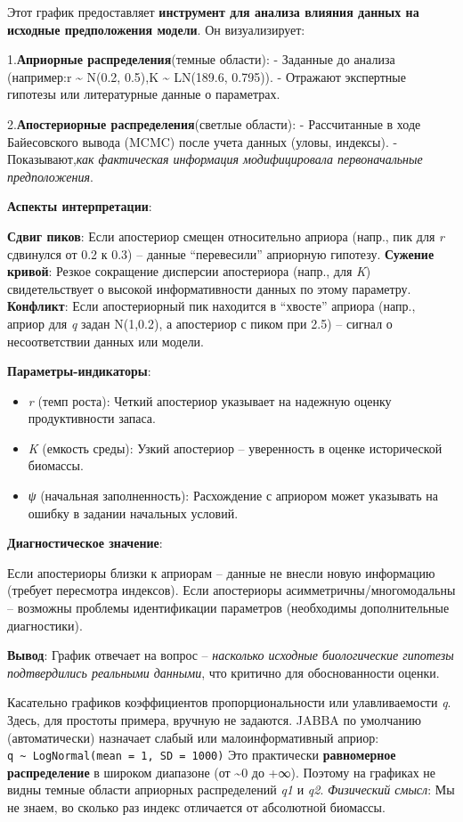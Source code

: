 \documentclass[
  letterpaper,
  DIV=11,
  numbers=noendperiod]{scrreprt}
\providecommand{\tightlist}{%
  \setlength{\itemsep}{0pt}\setlength{\parskip}{0pt}}
\begin{document}
Этот график предоставляет \textbf{инструмент для анализа влияния данных
на исходные предположения модели}. Он визуализирует:

1.\textbf{Априорные распределения}(темные области): - Заданные до
анализа (например:r \textasciitilde{} N(0.2, 0.5),K \textasciitilde{}
LN(189.6, 0.795)). - Отражают экспертные гипотезы или литературные
данные о параметрах.

2.\textbf{Апостериорные распределения}(светлые области): - Рассчитанные
в ходе Байесовского вывода (MCMC) после учета данных (уловы, индексы). -
Показывают,\emph{как фактическая информация модифицировала
первоначальные предположения}.

\textbf{Аспекты интерпретации}:

\textbf{Сдвиг пиков}: Если апостериор смещен относительно априора
(напр., пик для \emph{r} сдвинулся от 0.2 к 0.3) -- данные
``перевесили'' априорную гипотезу. \textbf{Сужение кривой}: Резкое
сокращение дисперсии апостериора (напр., для \emph{K}) свидетельствует о
высокой информативности данных по этому параметру. \textbf{Конфликт}:
Если апостериорный пик находится в ``хвосте'' априора (напр., априор для
\emph{q} задан N(1,0.2), а апостериор с пиком при 2.5) -- сигнал о
несоответствии данных или модели.

\textbf{Параметры-индикаторы}:

\begin{itemize}
\tightlist
\item
  \emph{r} (темп роста): Четкий апостериор указывает на надежную оценку
  продуктивности запаса.
\item
  \emph{K} (емкость среды): Узкий апостериор -- уверенность в оценке
  исторической биомассы.
\item
  \emph{ψ} (начальная заполненность): Расхождение с априором может
  указывать на ошибку в задании начальных условий.
\end{itemize}

\textbf{Диагностическое значение}:

Если апостериоры близки к априорам -- данные не внесли новую информацию
(требует пересмотра индексов). Если апостериоры
асимметричны/многомодальны -- возможны проблемы идентификации параметров
(необходимы дополнительные диагностики).

\textbf{Вывод}: График отвечает на вопрос -- \emph{насколько исходные
биологические гипотезы подтвердились реальными данными}, что критично
для обоснованности оценки.

Касательно графиков коэффициентов пропорциональности или улавливаемости
\emph{q}. Здесь, для простоты примера, вручную не задаются. JABBA по
умолчанию (автоматически) назначает слабый или малоинформативный априор:
\texttt{q\ \textasciitilde{}\ LogNormal(mean\ =\ 1,\ SD\ =\ 1000)} Это
практически \textbf{равномерное распределение} в широком диапазоне (от
\textasciitilde0 до +∞). Поэтому на графиках не видны темные области
априорных распределений \emph{q1} и \emph{q2}. \emph{Физический смысл}:
Мы не знаем, во сколько раз индекс отличается от абсолютной биомассы.
\end{document}
